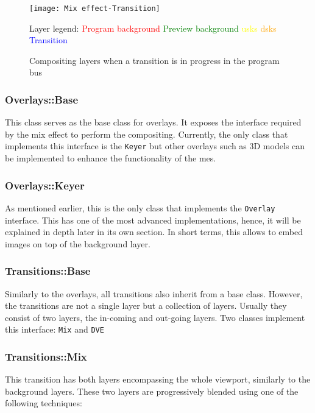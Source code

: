 \documentclass[../main.tex]{subfiles}
\begin{document}
\begin{landscape}
\begin{figure}[htbp]
    \centering
    \texttt{[image: Mix effect-Transition]}
    
    Layer legend: \textcolor{red}{Program background} \textcolor{green}{Preview background} \textcolor{yellow}{\glspl{usk}} \textcolor{orange}{\glspl{dsk}} \textcolor{blue}{Transition} 
    \caption{Compositing layers when a transition is in progress in the program bus}
    \label{fig:04:compositing_transition}
\end{figure}
\end{landscape}

\subsubsection{Overlays::Base}
This class serves as the base class for overlays. It exposes the interface required by the mix effect to perform the compositing. Currently, the only class that implements this interface is the \texttt{Keyer} but other overlays such as 3D models can be implemented to enhance the functionality of the \glspl{me}.

\subsubsection{Overlays::Keyer}
As mentioned earlier, this is the only class that implements the \texttt{Overlay} interface. This has one of the most advanced implementations, hence, it will be explained in depth later in its own section. In short terms, this allows to embed images on top of the background layer.

\subsubsection{Transitions::Base}
Similarly to the overlays, all transitions also inherit from a base class. However, the transitions are not a single layer but a collection of layers. Usually they consist of two layers, the in-coming and out-going layers. Two classes implement this interface: \texttt{Mix} and \texttt{DVE}

\subsubsection{Transitions::Mix}
This transition has both layers encompassing the whole viewport, similarly to the background layers. These two layers are progressively blended using one of the following techniques:
\end{document}
